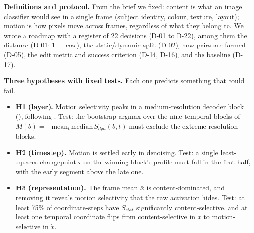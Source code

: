 \documentclass[twoside,english]{article}
\newcommand{\xs}{\bar{x}}         %
\newcommand{\xd}{\tilde{x}}       %
\begin{document}
\textbf{Definitions and protocol.} From the brief we fixed: content is what an image
classifier would see in a single frame (subject identity, colour, texture, layout); motion is how
pixels move across frames, regardless of what they belong to. We wrote a roadmap with a register
of 22 decisions (D-01 to D-22), among them the distance (D-01: $1-\cos$), the static/dynamic
split (D-02), how pairs are formed (D-05), the edit metric and success criterion (D-14, D-16),
and the baseline (D-17).

\textbf{Three hypotheses with fixed tests.} Each one predicts something that could fail.
\begin{itemize}
\item \textbf{H1 (layer).} Motion selectivity peaks in a medium-resolution decoder block
  (), following \citep{xiao2024moft}. Test: the bootstrap argmax over the
  nine temporal blocks of $M(b) = -\mathrm{mean}_t\,\mathrm{median}\,S_{dyn}(b,t)$ must
  exclude the extreme-resolution blocks.
\item \textbf{H2 (timestep).} Motion is settled early in denoising. Test: a single least-squares
  changepoint $\tau$ on the winning block's profile must fall in the first half, with the early
  segment above the late one.
\item \textbf{H3 (representation).} The frame mean $\xs$ is content-dominated, and removing it
  reveals motion selectivity that the raw activation hides. Test: at least 75\% of
  coordinate-steps have $S_{stat}$ significantly content-selective, and at least one temporal
  coordinate flips from content-selective in $\xs$ to motion-selective in $\xd$.
\end{itemize}
\end{document}
